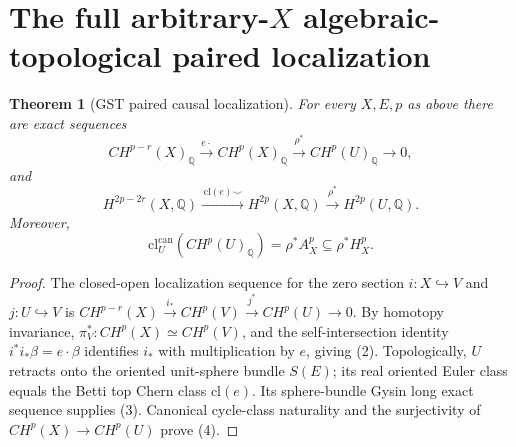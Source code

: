 \documentclass[11pt]{article}
\newtheorem{theorem}{Theorem}
\begin{document}
\section{The full arbitrary-$X$ algebraic-topological paired localization}
\begin{theorem}[GST paired causal localization]
For every $X,E,p$ as above there are exact sequences
\[
 CH^{p-r}(X)_{\mathbb Q}
   \xrightarrow{\, e\cdot\,}
 CH^p(X)_{\mathbb Q}
   \xrightarrow{\rho^*}
 CH^p(U)_{\mathbb Q}\longrightarrow0,                    \tag{2}
\]
and
\[
 H^{2p-2r}(X,\mathbb Q)
   \xrightarrow{\,\mathrm{cl}(e)\smile\,}
 H^{2p}(X,\mathbb Q)
   \xrightarrow{\rho^*}
 H^{2p}(U,\mathbb Q).                                     \tag{3}
\]
Moreover,
\[
 \boxed{\mathrm{cl}^{\mathrm{can}}_U(CH^p(U)_{\mathbb Q})
       =\rho^*A_X^p\subseteq\rho^*H_X^p.}                 \tag{4}
\]
\end{theorem}
\begin{proof}
The closed-open localization sequence for the zero section
$i:X\hookrightarrow V$ and $j:U\hookrightarrow V$ is
$CH^{p-r}(X)\xrightarrow{i_*}CH^p(V)
 \xrightarrow{j^*}CH^p(U)\to0$.
By homotopy invariance, $\pi_V^*:CH^p(X)\simeq CH^p(V)$,
and the self-intersection identity $i^*i_*\beta=e\cdot\beta$
identifies $i_*$ with multiplication by $e$, giving (2).
Topologically, $U$ retracts onto the oriented unit-sphere
bundle $S(E)$; its real oriented Euler class equals the Betti
top Chern class $\mathrm{cl}(e)$. Its sphere-bundle Gysin
long exact sequence supplies (3). Canonical cycle-class naturality
and the surjectivity of $CH^p(X)\to CH^p(U)$ prove (4).
\end{proof}
\end{document}
